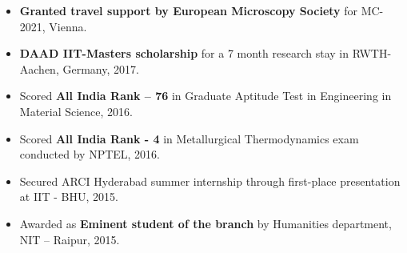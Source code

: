 
\begin{itemize}

\item \textbf{Granted travel support by European Microscopy Society} for MC-2021, Vienna. 
\item \textbf{DAAD IIT-Masters scholarship} for a 7 month research stay in RWTH-Aachen, Germany, 2017.
\item Scored \textbf{All India Rank – 76} in Graduate Aptitude Test in Engineering in Material Science, 2016. 
\item Scored \textbf{All India Rank - 4} in Metallurgical Thermodynamics exam conducted by NPTEL, 2016.
\item Secured ARCI Hyderabad summer internship through first-place presentation at IIT - BHU, 2015. 
\item Awarded as \textbf{Eminent student of the branch} by Humanities department, NIT – Raipur, 2015.

\end{itemize}